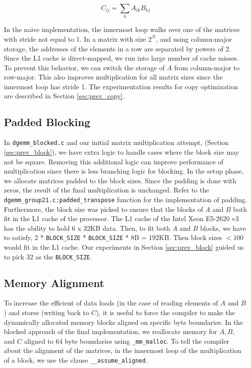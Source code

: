 \documentclass[11pt]{article}
\begin{document}
\begin{equation}
	C_{ij} = \sum_k A_{ik} B_{kj}
\end{equation}

In the naive implementation, the innermost loop walks over one of the matrices with stride not equal to 1. In a matrix with size $2^N$, and using column-major storage, the addresses of the elements in a row are  separated by powers of 2. Since the L1 cache is direct-mapped, we run into large number of cache misses. \\


To prevent this behavior, we can switch the storage of $A$ from column-major to row-major. This also improves multiplication for all matrix sizes since the innermost loop has stride 1. The experimentation results for copy optimization are described in Section \ref{sec:prev_copy}.

\subsection{Padded Blocking}\label{sec:block}
In \texttt{dgemm\_blocked.c} and our initial matrix multiplication attempt, (Section \ref{sec:prev_block}), we have extra logic to handle cases where the block size may not be square. Removing this additional logic can improve performance of multiplication since there is less branching logic for blocking. In the setup phase, we allocate matrices padded to the block sizes. Since the padding is done with zeros, the result of the final multiplication is unchanged. Refer to the \texttt{dgemm\_group21.c:padded\_transpose} function for the implementation of padding. \\

Furthermore, the block size was picked to ensure that the blocks of $A$ and $B$ both fit in the L1 cache of the processor. The L1 cache of the Intel Xeon E5-2620 v3 has the ability to hold 6 x 32KB data. Then, to fit both $A$ and $B$ blocks, we have to satisfy, 2 * \texttt{BLOCK\_SIZE} * \texttt{BLOCK\_SIZE} * 8B = 192KB. Then block sizes $< 100$ would fit in the L1 cache. Our experiments in Section \ref{sec:prev_block} guided us to pick 32 as the \texttt{BLOCK\_SIZE}.


\subsection{Memory Alignment}\label{sec:align}
To increase the efficient of data loads (in the case of reading elements of $A$ and $B$) and stores (writing back to $C$), it is useful to force the compiler to make the dynamically allocated memory blocks aligned on specific byte boundaries. \cite{vectorization} In the blocked approach of the final implementation, we reallocate memory for $A, B,$ and $C$ aligned to 64 byte boundaries using \texttt{\_mm\_malloc}. To tell the compiler about the alignment of the matrices, in the innermost loop of the multiplication of a block, we use the clause \texttt{\_\_assume\_aligned}. \cite{vectorization}
\end{document}
